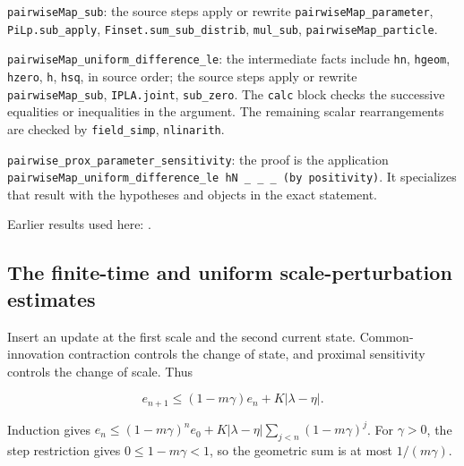 \documentclass[11pt,a4paper]{report}
\begin{document}
\begin{leanbox}
\texttt{pairwise\allowbreak{}Map\_\allowbreak{}sub}: the source steps apply or rewrite \texttt{pairwise\allowbreak{}Map\_\allowbreak{}parameter}, \texttt{Pi\allowbreak{}Lp.\allowbreak{}sub\_\allowbreak{}apply}, \texttt{Finset.\allowbreak{}sum\_\allowbreak{}sub\_\allowbreak{}distrib}, \texttt{mul\_\allowbreak{}sub}, \texttt{pairwise\allowbreak{}Map\_\allowbreak{}particle}.



\texttt{pairwise\allowbreak{}Map\_\allowbreak{}uniform\_\allowbreak{}difference\_\allowbreak{}le}: the intermediate facts include \texttt{hn}, \texttt{hgeom}, \texttt{hzero}, \texttt{h}, \texttt{hsq}, in source order; the source steps apply or rewrite \texttt{pairwise\allowbreak{}Map\_\allowbreak{}sub}, \texttt{IPLA.\allowbreak{}joint}, \texttt{sub\_\allowbreak{}zero}. The \texttt{calc} block checks the successive equalities or inequalities in the argument. The remaining scalar rearrangements are checked by \texttt{field\_\allowbreak{}simp}, \texttt{nlinarith}.



\texttt{pairwise\_\allowbreak{}prox\_\allowbreak{}parameter\_\allowbreak{}sensitivity}: the proof is the application \texttt{pairwise\allowbreak{}Map\_\allowbreak{}uniform\_\allowbreak{}difference\_\allowbreak{}le h\allowbreak{}N \_\allowbreak{} \_\allowbreak{} \_\allowbreak{} (by positivity)}. It specializes that result with the hypotheses and objects in the exact statement.
\end{leanbox}


Earlier results used here: \cite[Section~3.1.1]{LangevinLean2026IPLA}.
\subsection{\texorpdfstring{The finite-time and uniform scale-perturbation estimates}{The finite-time and uniform scale-perturbation estimates}}
\label{report-step-ProximalLangevin-ProxParameter-lean-4}


Insert an update at the first scale and the second current state. Common-innovation contraction controls the change of state, and proximal sensitivity controls the change of scale. Thus

\[e_{n+1}\le(1-m\gamma)e_n+K|\lambda-\eta|.\]

Induction gives \(e_n\le(1-m\gamma)^ne_0+K|\lambda-\eta|\sum_{j<n}(1-m\gamma)^j\). For \(\gamma>0\), the step restriction gives \(0\le1-m\gamma<1\), so the geometric sum is at most \(1/(m\gamma)\).
\end{document}
